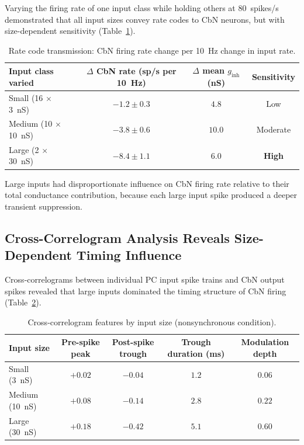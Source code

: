 \documentclass[11pt]{article}
\begin{document}
Varying the firing rate of one input class while holding others at 80~spikes/s demonstrated that all input sizes convey rate codes to CbN neurons, but with size-dependent sensitivity (Table~\ref{tab:ratecode}).

\begin{table}[H]
\centering
\caption{Rate code transmission: CbN firing rate change per 10~Hz change in input rate.}
\label{tab:ratecode}
\begin{tabular}{lccc}
\toprule
\textbf{Input class varied} & \textbf{$\Delta$ CbN rate (sp/s per 10~Hz)} & \textbf{$\Delta$ mean $g_\mathrm{inh}$ (nS)} & \textbf{Sensitivity} \\
\midrule
Small (16 $\times$ 3~nS) & $-1.2 \pm 0.3$ & $4.8$ & Low \\
Medium (10 $\times$ 10~nS) & $-3.8 \pm 0.6$ & $10.0$ & Moderate \\
Large (2 $\times$ 30~nS) & $-8.4 \pm 1.1$ & $6.0$ & \textbf{High} \\
\bottomrule
\end{tabular}
\end{table}

Large inputs had disproportionate influence on CbN firing rate relative to their total conductance contribution, because each large input spike produced a deeper transient suppression.

\subsection{Cross-Correlogram Analysis Reveals Size-Dependent Timing Influence}

Cross-correlograms between individual PC input spike trains and CbN output spikes revealed that large inputs dominated the timing structure of CbN firing (Table~\ref{tab:xcorr}).

\begin{table}[H]
\centering
\caption{Cross-correlogram features by input size (nonsynchronous condition).}
\label{tab:xcorr}
\begin{tabular}{lcccc}
\toprule
\textbf{Input size} & \textbf{Pre-spike peak} & \textbf{Post-spike trough} & \textbf{Trough duration (ms)} & \textbf{Modulation depth} \\
\midrule
Small (3~nS) & $+0.02$ & $-0.04$ & $1.2$ & $0.06$ \\
Medium (10~nS) & $+0.08$ & $-0.14$ & $2.8$ & $0.22$ \\
Large (30~nS) & $+0.18$ & $\mathbf{-0.42}$ & $\mathbf{5.1}$ & $\mathbf{0.60}$ \\
\bottomrule
\end{tabular}
\end{table}
\end{document}
